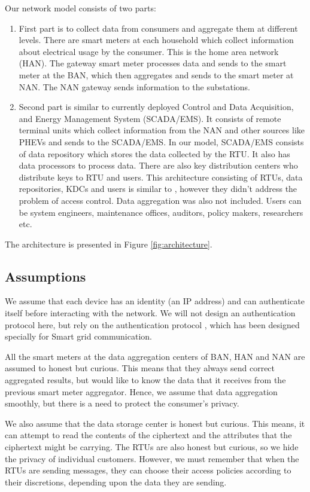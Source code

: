 \documentclass[conference]{IEEEtran}[10pt]
\begin{document}
Our network model consists of two parts:
\begin{enumerate} 
\item First part is to collect data from consumers and aggregate them at different levels.
There are smart meters at each household which collect information about electrical usage by the consumer. 
This is the home area network (HAN).
The gateway smart meter processes data and sends to the smart meter at the BAN, which then aggregates and sends to the smart meter at NAN. 
The NAN gateway sends information to the substations. 
\item Second part is similar to currently deployed Control and Data Acquisition, and Energy Management
System (SCADA/EMS). It consists of remote terminal units which collect information from the NAN and other sources like PHEVs and
sends to the SCADA/EMS. 
In our model, SCADA/EMS consists of data repository which stores the data collected by the RTU. 
It also has data processors to process data. 
There are also key distribution centers who distribute keys to RTU and users.
This architecture consisting of RTUs, data repositories, KDCs and users is similar to \cite{KTKL10}, however they didn't address the problem of access control. 
Data aggregation was also not included. 
Users can be system engineers, maintenance offices, auditors, policy makers, researchers etc. 
\end{enumerate}
The architecture is presented in Figure \ref{fig:architecture}. 





 
\subsection{Assumptions}
\label{subsec:assumptions}
We assume that each device has an identity (an IP address) and can authenticate itself before interacting with the network. 
We will not design an authentication protocol here, but rely on the authentication protocol \cite{FFKLS10}, which has been designed
specially for Smart grid communication. 

All the smart meters at the data aggregation centers of BAN, HAN and NAN are assumed to honest but curious. 
This means that they always send correct aggregated results, but would like to know the data that it receives from the previous 
smart meter aggregator. 
Hence, we assume that data aggregation smoothly, but there is a need to protect the consumer's privacy. 

We also assume that the data storage center is honest but curious. 
This means, it can attempt to read the contents of the ciphertext and the attributes that the ciphertext might be carrying. 
The RTUs are also honest but curious, so we hide the privacy of individual customers. 
However, we must remember that when the RTUs are sending messages, they can choose their access policies according to their discretions, 
depending upon the data they are sending. 
\end{document}
